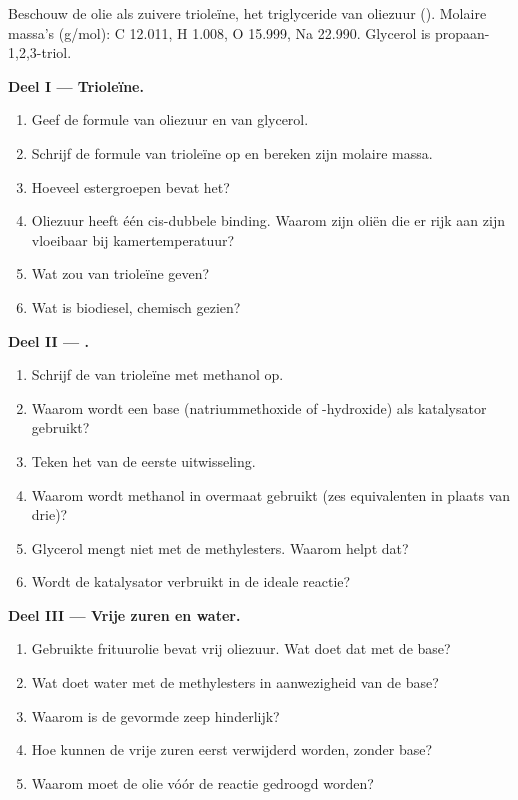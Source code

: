 \begin{problem}
\label{pb:b2:acyl-substitution:1}
Beschouw de olie als zuivere trioleïne, het triglyceride van oliezuur (). Molaire massa's
(\unit{g/mol}): C 12.011, H 1.008, O 15.999, Na 22.990. Glycerol is propaan-1,2,3-triol.

\medskip
\noindent\textbf{Deel I --- Trioleïne.}
\begin{enumerate}
  \item Geef de formule van oliezuur en van glycerol.
  \item Schrijf de formule van trioleïne op en bereken zijn molaire massa.
  \item Hoeveel estergroepen bevat het?
  \item Oliezuur heeft één cis-dubbele binding. Waarom zijn oliën die er rijk aan zijn vloeibaar bij kamertemperatuur?
  \item Wat zou  van trioleïne geven?
  \item Wat is biodiesel, chemisch gezien?
\end{enumerate}

\medskip
\noindent\textbf{Deel II --- .}
\begin{enumerate}[resume]
  \item Schrijf de  van trioleïne met methanol op.
  \item Waarom wordt een base (natriummethoxide of -hydroxide) als katalysator gebruikt?
  \item Teken het  van de eerste uitwisseling.
  \item Waarom wordt methanol in overmaat gebruikt (zes equivalenten in plaats van drie)?
  \item Glycerol mengt niet met de methylesters. Waarom helpt dat?
  \item Wordt de katalysator verbruikt in de ideale reactie?
\end{enumerate}

\medskip
\noindent\textbf{Deel III --- Vrije zuren en water.}
\begin{enumerate}[resume]
  \item Gebruikte frituurolie bevat vrij oliezuur. Wat doet dat met de base?
  \item Wat doet water met de methylesters in aanwezigheid van de base?
  \item Waarom is de gevormde zeep hinderlijk?
  \item Hoe kunnen de vrije zuren eerst verwijderd worden, zonder base?
  \item Waarom moet de olie vóór de reactie gedroogd worden?
\end{enumerate}


\end{problem}
